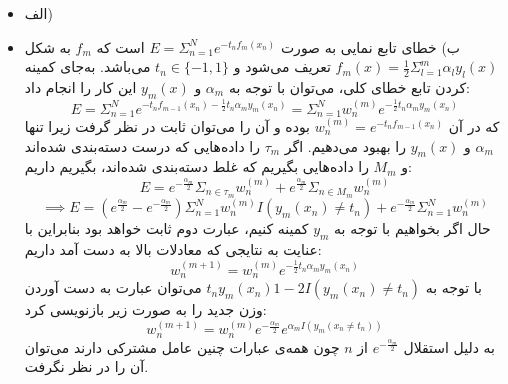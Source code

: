 
\begin{itemize}
	\item الف)
	\item ب)
	خطای تابع نمایی به صورت 
	$E = \Sigma_{n=1}^Ne^{-t_nf_m(x_n)}$
	است که $f_m$ به شکل 
	$f_m(x) = \frac{1}{2}\Sigma_{l = 1}^m\alpha_ly_l(x)$
	تعریف می‌شود و 
	$t_n \in \{-1, 1\}$
	می‌باشد. به‌جای کمینه کردن تابع خطای کلی، می‌توان با توجه به $\alpha_m$ و $y_m(x)$ این کار را انجام داد:
	$$
	E = \Sigma_{n=1}^Ne^{-t_nf_{m - 1}(x_n)-\frac{1}{2}t_n\alpha_my_m(x_n)} = \Sigma_{n = 1}^N w_n^{(m)}e^{-\frac{1}{2}t_n\alpha_my_m(x_n)}
	$$
	که در آن 
	$w_n^{(m)} = e^{-t_nf_{m-1}(x_n)}$
	بوده و آن را می‌توان ثابت در نظر گرفت زیرا تنها $\alpha_m$ و $y_m(x)$ را بهبود می‌دهیم. اگر $\tau_m$ را داده‌هایی که درست دسته‌بندی شده‌اند و $M_m$ را داده‌هایی بگیریم که غلط دسته‌بندی شده‌اند، بگیریم داریم:
	$$
	E = e^{-\frac{\alpha_m}{2}}\Sigma_{n \in \tau_m} w_n^{(m)} + e^{\frac{\alpha_m}{2}} \Sigma_{n \in M_m} w_n^{(m)} 
	$$
	$$
	\implies E = (e^{\frac{\alpha_m}{2}} - e^{-\frac{\alpha_m}{2}})\Sigma_{n = 1}^Nw_n^{(m)}I(y_m(x_n)\neq t_n) + e^{-\frac{\alpha_m}{2}}\Sigma_{n = 1}^Nw_n^{(m)}
	$$
	حال اگر بخواهیم با توجه به $y_m$ کمینه کنیم، عبارت دوم ثابت خواهد بود بنابراین با عنایت به نتایجی که معادلات بالا به دست آمد داریم:
	$$
	w_n^{(m + 1)} = w_n^{(m)} e^{-\frac{1}{2}t_n\alpha_my_m(x_n)}
	$$
	با توجه به 
	$t_ny_m(x_n) 1 - 2I(y_m(x_n) \neq t_n)$ می‌توان عبارت به دست آوردن وزن جدید را به صورت زیر بازنویسی کرد:
	$$
	w_n^{(m + 1)} = w_n^{(m)}e^{-\frac{\alpha_m}{2}}e^{\alpha_mI(y_m(x_n \neq t_n))}
	$$
	به دلیل استقلال 
	$e^{-\frac{\alpha_m}{2}}$ از 
	$n$
	چون همه‌ی عبارات چنین عامل مشترکی دارند می‌توان آن را در نظر نگرفت. 
\end{itemize}